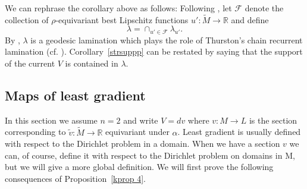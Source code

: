\documentclass{ip-journal}
\theoremstyle{definition}
\numberwithin{equation}{section}
\newcommand{\R}{\mathbb R}
\begin{document}
 We can rephrase the corollary above as follows: 
  Following \cite[Definition 1.2]{kassel}, let $\mathcal F$ denote the collection of $\rho$-equivariant  best Lipschitz functions $u': \tilde M \rightarrow \R$ and define 
  \[
\lambda=\cap_{u' \in \mathcal F} \lambda_{u'}.
\]
By \cite[Lemma 5.2]{kassel}, $\lambda$ is a geodesic lamination which
 plays the role of Thurston's chain recurrent lamination (cf. \cite[Theorem 8.2]{thurston}).
 Corollary~\ref{strsuppp} can be restated by saying that the support of the current $V$  is contained in $\lambda$.

 
\subsection{Maps of least gradient}\label{LGRad} In this section we assume $n=2$ and write $V=dv$ where $v: M \rightarrow L$ is the section corresponding to $\tilde v: \tilde M \rightarrow \R$ equivariant under $\alpha$.
Least gradient is usually defined with respect to the Dirichlet problem in a domain.  When we have a section  $v$  we can, of course, define it with respect to the Dirichlet problem on domains in M, but we will give a more global definition. We will first prove the following consequences of Proposition~\ref{kprop 4}.
\end{document}
